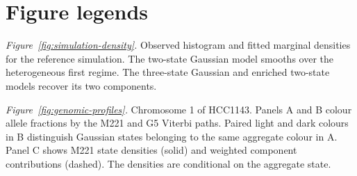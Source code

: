 \section*{Figure legends}

\noindent\textit{Figure~\ref{fig:simulation-density}.} Observed histogram and fitted marginal densities for the reference
simulation. The two-state Gaussian model smooths over the heterogeneous first
regime. The three-state Gaussian and enriched two-state models recover its two
components.

\noindent\textit{Figure~\ref{fig:genomic-profiles}.} Chromosome 1 of HCC1143. Panels A and B colour allele fractions by
the M221 and G5 Viterbi paths. Paired light and dark colours in B distinguish
Gaussian states belonging to the same aggregate colour in A. Panel C shows
M221 state densities (solid) and weighted component contributions (dashed).
The densities are conditional on the aggregate state.
